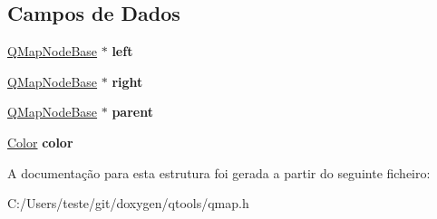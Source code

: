 \subsection*{Campos de Dados}
\begin{DoxyCompactItemize}
\item 
\hypertarget{struct_q_map_node_base_a3e6c3947e96210569a25230d708f219f}{\hyperlink{struct_q_map_node_base}{Q\-Map\-Node\-Base} $\ast$ {\bfseries left}}\label{struct_q_map_node_base_a3e6c3947e96210569a25230d708f219f}

\item 
\hypertarget{struct_q_map_node_base_a110cc64c1236f3fe74c99725e6f7c0d5}{\hyperlink{struct_q_map_node_base}{Q\-Map\-Node\-Base} $\ast$ {\bfseries right}}\label{struct_q_map_node_base_a110cc64c1236f3fe74c99725e6f7c0d5}

\item 
\hypertarget{struct_q_map_node_base_af2c4631bbd18cc0821e2afd9481deb8e}{\hyperlink{struct_q_map_node_base}{Q\-Map\-Node\-Base} $\ast$ {\bfseries parent}}\label{struct_q_map_node_base_af2c4631bbd18cc0821e2afd9481deb8e}

\item 
\hypertarget{struct_q_map_node_base_aa5f4d1eda21c196bd8401ff73f105073}{\hyperlink{struct_color}{Color} {\bfseries color}}\label{struct_q_map_node_base_aa5f4d1eda21c196bd8401ff73f105073}

\end{DoxyCompactItemize}


A documentação para esta estrutura foi gerada a partir do seguinte ficheiro\-:\begin{DoxyCompactItemize}
\item 
C\-:/\-Users/teste/git/doxygen/qtools/qmap.\-h\end{DoxyCompactItemize}
